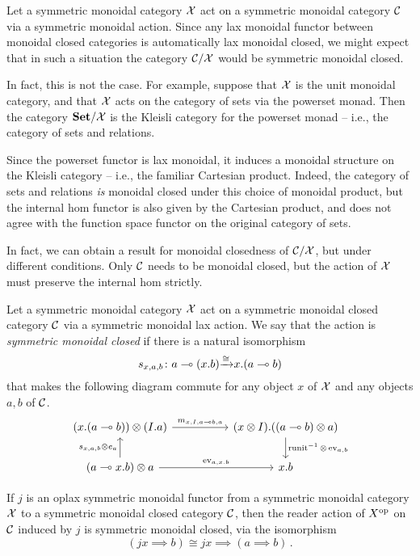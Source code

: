 \documentclass{article}
\begin{document}
Let a symmetric monoidal category $\mathcal X$ act on a symmetric monoidal category ${\mathcal{C}}$ via a symmetric monoidal action.  
Since any lax monoidal functor between monoidal closed categories is automatically lax monoidal closed, we might expect that in such a situation the category ${\mathcal{C}}/\mathcal X$ would be symmetric monoidal closed.

In fact, this is not the case.  
For example, suppose that $\mathcal X$ is the unit monoidal category, and that $\mathcal X$ acts on the category of sets via the powerset monad.  
Then the category ${\normalfont\textbf{Set}}/\mathcal X$ is the Kleisli category for the powerset monad -- i.e., the category of sets and relations.  

Since the powerset functor is lax monoidal, it induces a monoidal structure on the Kleisli category -- i.e., the familiar Cartesian product.  
Indeed, the category of sets and relations \emph{is} monoidal closed under this choice of monoidal product, but the internal hom functor is also given by the Cartesian product, and does not agree with the function space functor on the original category of sets.

In fact, we can obtain a result for monoidal closedness of ${\mathcal{C}}/\mathcal X$, but under different conditions.  
Only ${\mathcal{C}}$ needs to be monoidal closed, but the action of $\mathcal X$ must preserve the internal hom strictly.

\begin{definition}
  Let a symmetric monoidal category $\mathcal X$ act on a symmetric monoidal closed category ${\mathcal{C}}$ via a symmetric monoidal lax action.
  We say that the action is \emph{symmetric monoidal closed} if there is a natural isomorphism
  \[
    s_{x,a,b} \colon a\multimap (x.b) {\xrightarrow{\cong}} x.(a\multimap b)
    \]
  that makes the following diagram commute for any object $x$ of $\mathcal X$ and any objects $a,b$ of ${\mathcal{C}}$.
  \[
    \begin{tikzcd}[column sep=50pt]
      (x.(a\implies b)) \tensor (I.a) \arrow[r, "{m_{x,I,a\implies b,a}}"]
        & (x \tensor I).((a\implies b)\tensor a) \arrow[d, "{\runit\inv\tensor \ev_{a,b}}"] \\
      (a \implies x.b)\tensor a \arrow[u, "{s_{x,a,b}\tensor e_a}"] \arrow[r, "{\ev_{a,x.b}}"]
        & x.b
    \end{tikzcd}
    \]
  \label{DefSymmetricMonoidalClosedAction}
\end{definition}

\begin{example}
  If $j$ is an oplax symmetric monoidal functor from a symmetric monoidal category $\mathcal X$ to a symmetric monoidal closed category ${\mathcal{C}}$, then the reader action of $X^{\mathrm{op}}$ on ${\mathcal{C}}$ induced by $j$ is symmetric monoidal closed, via the isomorphism
  \[
    (jx \implies b) \cong jx \implies (a \implies b)\,.
    \]
\end{example}
\end{document}
